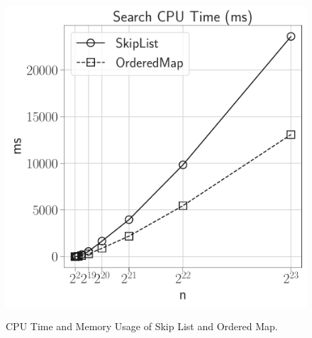 \documentclass[12pt]{article}
\begin{document}
\begin{figure}[H]
\begin{minipage}{0.32\textwidth}
		\label{fig:physical_memory}
	\end{minipage}\hfill\
	\begin{minipage}{0.32\textwidth}
		\centering
		\includegraphics[width=\linewidth]{../notebook/plot/sl_search_cpu_time_(ms).pdf}
		\label{fig:physical_memory}
	\end{minipage}\hfill
	\caption{CPU Time and Memory Usage of Skip List and Ordered Map.}
\end{figure}
\end{document}
